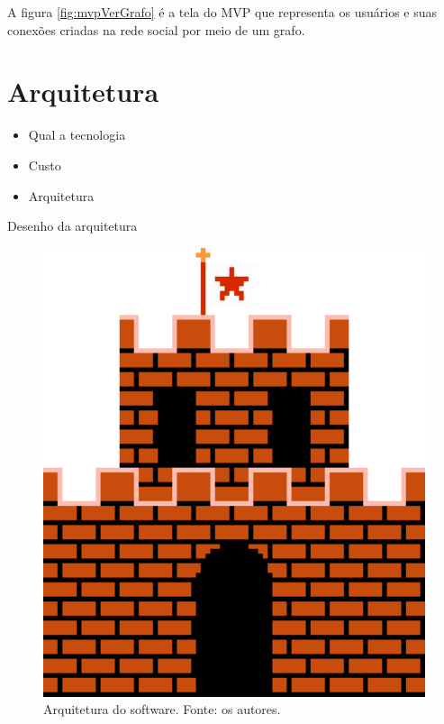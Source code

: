 \FloatBarrier


A figura \ref{fig:mvpVerGrafo} é a tela do MVP que representa os usuários e suas conexões criadas na rede social por meio de um grafo.


\section{Arquitetura}

\begin{itemize}
\item Qual a tecnologia
\item Custo
\item Arquitetura
\end{itemize}

Desenho da arquitetura

\begin{figure}[!htb]
\centering
\includegraphics[width=14cm]{arquitetura.png}
\caption{Arquitetura do software. Fonte: os autores.}
\label{fig:arquitetura}
\end{figure}

\FloatBarrier

